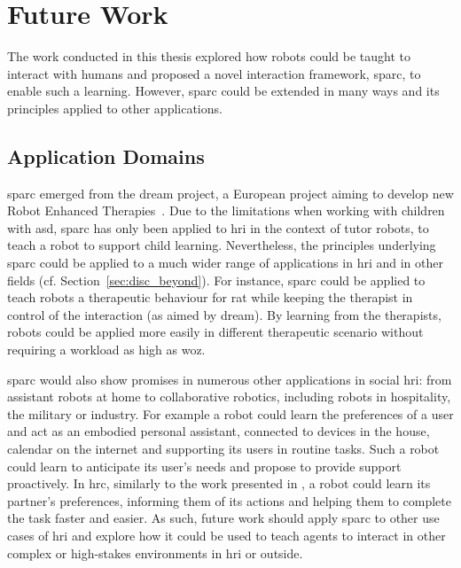 \section{Future Work}

The work conducted in this thesis explored how robots could be taught to interact with humans and proposed a novel interaction framework, \gls{sparc}, to enable such a learning. However, \gls{sparc} could be extended in many ways and its principles applied to other applications.

\subsection{Application Domains}

\gls{sparc} emerged from the \acrshort{dream} project, a European project aiming to develop new Robot Enhanced Therapies~\citep{thill2012robot,esteban2017build}. Due to the limitations when working with children with \gls{asd}, \gls{sparc} has only been applied to \gls{hri} in the context of tutor robots, to teach a robot to support child learning. Nevertheless, the principles underlying \gls{sparc} could be applied to a much wider range of applications in \gls{hri} and in other fields (cf. Section~\ref{sec:disc_beyond}). For instance, \gls{sparc} could be applied to teach robots a therapeutic behaviour for \gls{rat} while keeping the therapist in control of the interaction (as aimed by \acrshort{dream}). By learning from the therapists, robots could be applied more easily in different therapeutic scenario without requiring a workload as high as \gls{woz}. 

\gls{sparc} would also show promises in numerous other applications in social \gls{hri}: from assistant robots at home to collaborative robotics, including robots in hospitality, the military or industry. For example a robot could learn the preferences of a user and act as an embodied personal assistant, connected to devices in the house, calendar on the internet and supporting its users in routine tasks. Such a robot could learn to anticipate its user's needs and propose to provide support proactively. In \gls{hrc}, similarly to the work presented in \cite{munzer2017efficient}, a robot could learn its partner's preferences, informing them of its actions and helping them to complete the task faster and easier. As such, future work should apply \gls{sparc} to other use cases of \gls{hri} and explore how it could be used to teach agents to interact in other complex or high-stakes environments in \gls{hri} or outside.

